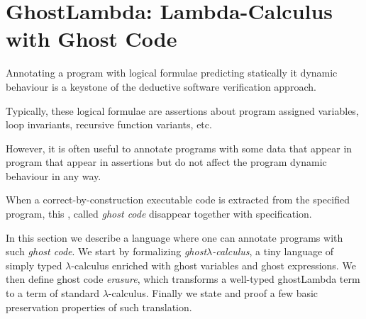 \section{GhostLambda: Lambda-Calculus with Ghost Code}
Annotating a program with logical formulae predicting statically it dynamic behaviour is a 
keystone of the deductive software verification approach.

Typically, these logical formulae are assertions about program assigned variables,
 loop invariants, recursive function variants, etc. 
 
 However,  it is often useful to annotate programs with some data that appear in program 
  that appear in assertions but do not affect the program dynamic behaviour in any way. 
   
 When a correct-by-construction executable code is extracted
 from the specified program, this , called \textit{ghost code} disappear together with
 specification. 
 
In this section we describe a language where one can annotate programs with such \textit{ghost code}.
We start by formalizing \textit{ghost}$\lambda$\textit{-calculus}, a tiny language of simply typed $\lambda$-calculus enriched with ghost variables and ghost expressions.
We then define ghost code \textit{erasure}, which transforms a well-typed ghostLambda term  to a term of standard  $\lambda$-calculus.
Finally we state and proof a few basic preservation properties of such translation.



